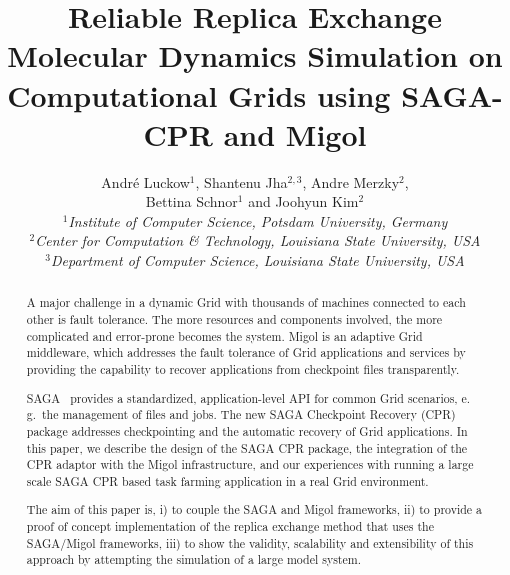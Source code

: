 \documentclass[times, 10pt,twocolumn]{article}
\title{Reliable Replica Exchange Molecular Dynamics Simulation on
  Computational Grids using SAGA-CPR and Migol}
\author{
  Andr\'e Luckow$^{1}$, 
  Shantenu Jha$^{2,3}$, 
  Andre Merzky$^{2}$, \\
  Bettina Schnor$^{1}$ and 
  Joohyun Kim$^{2}$\\
  \small{\emph{$^{1}$Institute of Computer Science, Potsdam University, Germany}}\\
  \small{\emph{$^{2}$Center for Computation \& Technology, Louisiana State University, USA}}\\
  \small{\emph{$^{3}$Department of Computer Science, Louisiana State University, USA}}\\
}
\begin{document}
 


\maketitle    

\begin{abstract}
A major challenge in a dynamic Grid with thousands of machines connected to each 
other is fault tolerance. The more resources and components involved, the more 
complicated and error-prone becomes the system.   Migol is an adaptive Grid middleware,
which addresses the fault tolerance of Grid applications and services 
by providing the capability to recover applications from checkpoint files transparently.

SAGA~\cite{SAGA_Goodale06a} provides a standardized, application-level API for 
common Grid scenarios, e.\,g.\
the management of files and jobs. The new SAGA Checkpoint Recovery (CPR) package addresses checkpointing 
and the automatic recovery of Grid applications. In this paper, we describe the design of 
the SAGA CPR package, the integration of the CPR adaptor with the Migol infrastructure, 
and our experiences with running a large scale SAGA CPR based task farming application 
in a real Grid environment.
    
The aim of this paper is, i) to couple the SAGA and Migol
frameworks, ii) to provide a proof of concept implementation of the
replica exchange method that uses the SAGA/Migol frameworks, iii) to show
the validity, scalability and extensibility of this approach by
attempting the simulation of a large model system.
\end{abstract}



                           
\end{document}
